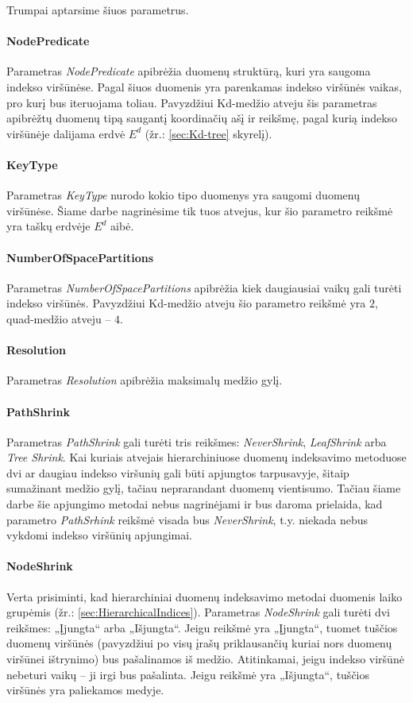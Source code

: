 Trumpai aptarsime šiuos parametrus.

\paragraph{NodePredicate}
Parametras {\it NodePredicate} apibrėžia duomenų struktūrą, kuri yra saugoma indekso viršūnėse.
Pagal šiuos duomenis yra parenkamas indekso viršūnės vaikas, pro kurį bus iteruojama toliau.
Pavyzdžiui Kd-medžio atveju šis parametras apibrėžtų duomenų tipą saugantį koordinačių ašį ir reikšmę, pagal kurią indekso viršūnėje dalijama erdvė $E^d$ (žr.: \ref{sec:Kd-tree} skyrelį).

\paragraph{KeyType}
Parametras {\it KeyType} nurodo kokio tipo duomenys yra saugomi duomenų viršūnėse.
Šiame darbe nagrinėsime tik tuos atvejus, kur šio parametro reikšmė yra taškų erdvėje $E^d$ aibė.

\paragraph{NumberOfSpacePartitions}
Parametras {\it NumberOfSpacePartitions} apibrėžia kiek daugiausiai vaikų gali turėti indekso viršūnės.
Pavyzdžiui Kd-medžio atveju šio parametro reikšmė yra $2$, quad-medžio atveju -- $4$.

\paragraph{Resolution}
Parametras {\it Resolution} apibrėžia maksimalų medžio gylį.

\paragraph{PathShrink}
Parametras {\it PathShrink} gali turėti tris reikšmes: {\it NeverShrink}, {\it LeafShrink} arba {\it Tree Shrink}.
Kai kuriais atvejais hierarchiniuose duomenų indeksavimo metoduose dvi ar daugiau indekso viršunių gali būti apjungtos tarpusavyje, šitaip sumažinant medžio gylį, tačiau neprarandant duomenų vientisumo.
Tačiau šiame darbe šie apjungimo metodai nebus nagrinėjami ir bus daroma prielaida, kad parametro {\it PathSrhink} reikšmė visada bus {\it NeverShrink}, t.y. niekada nebus vykdomi indekso viršūnių apjungimai.

\paragraph{NodeShrink}
Verta prisiminti, kad hierarchiniai duomenų indeksavimo metodai duomenis laiko grupėmis (žr.: \ref{sec:HierarchicalIndices}).
Parametras {\it NodeShrink} gali turėti dvi reikšmes: „Įjungta“ arba „Išjungta“.
Jeigu reikšmė yra „Įjungta“, tuomet tuščios duomenų viršūnės (pavyzdžiui po visų įrašų priklausančių kuriai nors duomenų viršūnei ištrynimo) bus pašalinamos iš medžio.
Atitinkamai, jeigu indekso viršūnė nebeturi vaikų -- ji irgi bus pašalinta.
Jeigu reikšmė yra „Išjungta“, tuščios viršūnės yra paliekamos medyje.


